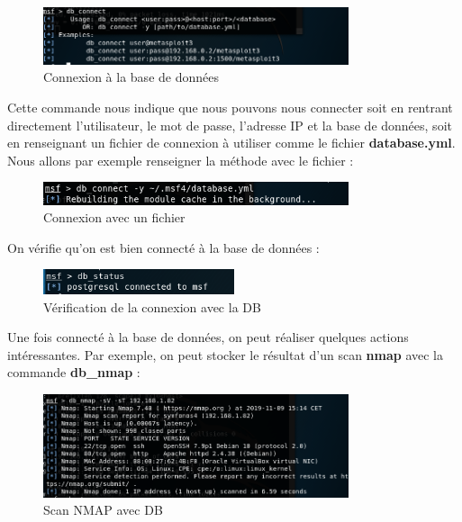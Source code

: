 \begin{figure}[htp!]
  \centering
  \setlength\figureheight{7cm}
  \setlength\figurewidth{9cm}
  \includegraphics[width=0.8\textwidth]{oui/Ancien/imangeancien/metasploit/db_connect.PNG}
  \caption{Connexion à la base de données}
  \label{fig:courbe-tikz}
\end{figure}
\noindent Cette commande nous indique que nous pouvons nous connecter soit en rentrant directement l'utilisateur, le mot de passe, l'adresse IP et la base de données, soit en renseignant un fichier de connexion à utiliser comme le fichier \textbf{database.yml}.\\

\noindent Nous allons par exemple renseigner la méthode avec le fichier :

\begin{figure}[htp!]
  \centering
  \setlength\figureheight{7cm}
  \setlength\figurewidth{9cm}
  \includegraphics[width=0.8\textwidth]{oui/Ancien/imangeancien/metasploit/db_connect2.PNG}
  \caption{Connexion avec un fichier}
  \label{fig:courbe-tikz}
\end{figure}

\noindent On vérifie qu'on est bien connecté à la base de données :

\begin{figure}[htp!]
  \centering
  \setlength\figureheight{7cm}
  \setlength\figurewidth{9cm}
  \includegraphics[width=0.5\textwidth]{oui/Ancien/imangeancien/metasploit/db_status2.PNG}
  \caption{Vérification de la connexion avec la DB}
  \label{fig:courbe-tikz}
\end{figure}

Une fois connecté à la base de données, on peut réaliser quelques actions intéressantes. Par exemple, on peut stocker le résultat d'un scan \textbf{nmap} avec la commande \textbf{db\_nmap} :

\begin{figure}[htp!]
  \centering
  \setlength\figureheight{7cm}
  \setlength\figurewidth{9cm}
  \includegraphics[width=0.8\textwidth]{oui/Ancien/imangeancien/metasploit/db_nmap.PNG}
  \caption{Scan NMAP avec DB}
  \label{fig:courbe-tikz}
\end{figure}

